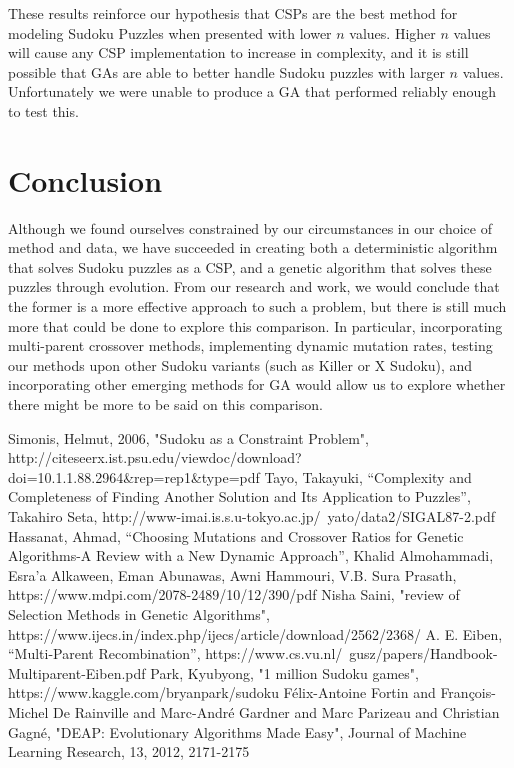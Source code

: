 \documentclass[12pt, conference]{IEEEtran}
\begin{document}
\par
These results reinforce our hypothesis that CSPs are the best method for modeling Sudoku Puzzles when presented with lower $n$ values.
Higher $n$ values will cause any CSP implementation to increase in complexity, and it is still possible that GAs are able to better handle Sudoku puzzles with larger $n$ values.
Unfortunately we were unable to produce a GA that performed reliably enough to test this.

\section{Conclusion}

Although we found ourselves constrained by our circumstances in our choice of method and data, we have succeeded in creating both a deterministic algorithm that solves Sudoku puzzles as a CSP, and a genetic algorithm that solves these puzzles through evolution.
 From our research and work, we would conclude that the former is a more effective approach to such a problem, but there is still much more that could be done to explore this comparison. 
In particular, incorporating multi-parent crossover methods, implementing dynamic mutation rates, testing our methods upon other Sudoku variants (such as Killer or X Sudoku), and incorporating other emerging methods for GA would allow us to explore whether there might be more to be said on this comparison.

\begin{thebibliography}{00}

Simonis, Helmut, 2006, "Sudoku as a Constraint Problem", http://citeseerx.ist.psu.edu/viewdoc/download?doi=10.1.1.88.2964\&rep=rep1\&type=pdf
Tayo, Takayuki, “Complexity and Completeness of Finding Another Solution and Its Application to Puzzles”, Takahiro Seta, http://www-imai.is.s.u-tokyo.ac.jp/~yato/data2/SIGAL87-2.pdf
Hassanat, Ahmad, “Choosing Mutations and Crossover Ratios for Genetic Algorithms-A Review with a New Dynamic Approach”,  Khalid Almohammadi, Esra’a Alkaween, Eman Abunawas, Awni Hammouri, V.B. Sura Prasath, https://www.mdpi.com/2078-2489/10/12/390/pdf 
Nisha Saini, "review of Selection Methods in Genetic Algorithms", https://www.ijecs.in/index.php/ijecs/article/download/2562/2368/
A. E. Eiben, “Multi-Parent Recombination”, https://www.cs.vu.nl/~gusz/papers/Handbook-Multiparent-Eiben.pdf
Park, Kyubyong, "1 million Sudoku games", https://www.kaggle.com/bryanpark/sudoku
 F\'elix-Antoine Fortin and Fran\c{c}ois-Michel {De Rainville} and Marc-Andr\'e Gardner and Marc Parizeau and Christian Gagn\'e, "DEAP: Evolutionary Algorithms Made Easy", Journal of Machine Learning Research, 13, 2012, 2171-2175

\end{thebibliography}
\end{document}
